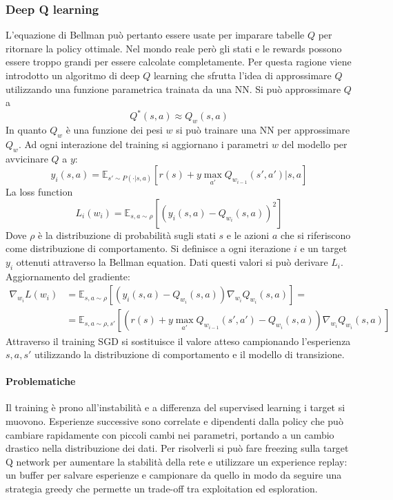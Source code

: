 		\subsubsection{Deep Q learning}
		L'equazione di Bellman pu\`o pertanto essere usate per imparare tabelle $Q$ per ritornare la policy ottimale.
		Nel mondo reale per\`o gli stati e le rewards possono essere troppo grandi per essere calcolate completamente.
		Per questa ragione viene introdotto un algoritmo di deep $Q$ learning che sfrutta l'idea di approssimare $Q$ utilizzando una funzione parametrica trainata da una NN.
		Si pu\`o approssimare $Q$ a
		$$Q^*(s,a) \approx Q_w(s,a)$$
		In quanto $Q_w$ \`e una funzione dei pesi $w$ si pu\`o trainare una NN per approssimare $Q_w$.
		Ad ogni interazione del training si aggiornano i parametri $w$ del modello per avvicinare $Q$ a $y$:
		$$y_i(s,a) = \mathbb{E}_{s'\sim P(\cdot|s,a)}[r(s)+y\max_{a'}Q_{w_{i-1}}(s',a')|s,a]$$
		La loss function
		$$L_i(w_i) = \mathbb{E}_{s,a\sim \rho}[(y_i(s,a) - Q_{w_i}(s,a))^2]$$
		Dove $\rho$ \`e la distribuzione di probabilit\`a sugli stati $s$ e le azioni $a$ che si riferiscono come distribuzione di comportamento.
		Si definisce a ogni iterazione $i$ e un target $y_i$ ottenuti attraverso la Bellman equation.
		Dati questi valori si pu\`o derivare $L_i$.
		Aggiornamento del gradiente:
		\begin{align*}
			\nabla_{w_i}L(w_i) &= \mathbb{E}_{s,a\sim\rho}[(y_i(s,a) - Q_{w_i}(s,a))\nabla_{w_i}Q_{w_i}(s,a)]=\\
								  &= \mathbb{E}_{s,a\sim\rho,s'}[(r(s) + y\max_{a'}Q_{w_{i-1}}(s',a')-Q_{w_i}(s,a))\nabla_{w_i}Q_{w_i}(s,a)]
		\end{align*}
		Attraverso il training SGD si sostituisce il valore atteso campionando l'esperienza $s,a,s'$ utilizzando la distribuzione di comportamento e il modello di transizione.

			\paragraph{Problematiche}
			Il training \`e prono all'instabilit\`a e a differenza del supervised learning i target si muovono.
			Esperienze successive sono correlate e dipendenti dalla policy che pu\`o cambiare rapidamente con piccoli cambi nei parametri, portando a un cambio drastico nella distribuzione dei dati.
			Per risolverli si pu\`o fare freezing sulla target Q network per aumentare la stabilit\`a della rete e utilizzare un experience replay: un buffer per salvare esperienze e campionare da quello in modo da seguire una strategia greedy che permette un trade-off tra exploitation ed esploration.

